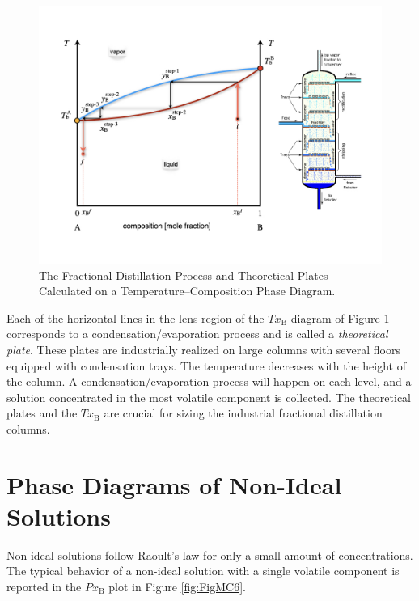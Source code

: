 \documentclass[
  9pt,
]{extbook}
\theoremstyle{definition}
\theoremstyle{definition}
\theoremstyle{definition}
\theoremstyle{definition}
\theoremstyle{remark}
\begin{document}
\begin{figure}

{\centering \includegraphics[width=0.6\linewidth]{./img/OEP_Figures.023} 

}

\caption{The Fractional Distillation Process and Theoretical Plates Calculated on a Temperature–Composition Phase Diagram.}\label{fig:FigMC5}
\end{figure}

Each of the horizontal lines in the lens region of the \(Tx_{\text{B}}\) diagram of Figure \ref{fig:FigMC5} corresponds to a condensation/evaporation process and is called a \emph{theoretical plate}. These plates are industrially realized on large columns with several floors equipped with condensation trays. The temperature decreases with the height of the column. A condensation/evaporation process will happen on each level, and a solution concentrated in the most volatile component is collected. The theoretical plates and the \(Tx_{\text{B}}\) are crucial for sizing the industrial fractional distillation columns.

\section{Phase Diagrams of Non-Ideal Solutions}\label{phase-diagrams-of-non-ideal-solutions}

Non-ideal solutions follow Raoult's law for only a small amount of concentrations. The typical behavior of a non-ideal solution with a single volatile component is reported in the \(Px_{\text{B}}\) plot in Figure \ref{fig:FigMC6}.
\end{document}
